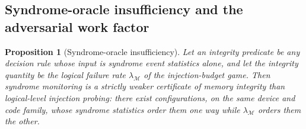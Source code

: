 \documentclass[pdflatex,sn-mathphys-num]{sn-jnl}
\theoremstyle{thmstyleone}
\newtheorem{proposition}[theorem]{Proposition}
\theoremstyle{thmstyletwo}
\theoremstyle{thmstylethree}
\begin{document}
\subsection{Syndrome-oracle insufficiency and the adversarial work factor}

\begin{proposition}[Syndrome-oracle insufficiency]\label{prop:syndrome-insufficient}
Let an \emph{integrity predicate} be any decision rule whose input is syndrome event statistics alone, and let the integrity quantity be the logical failure rate $\lambda_{\mathcal{M}}$ of the injection-budget game. Then syndrome monitoring is a strictly weaker certificate of memory integrity than logical-level injection probing: there exist configurations, on the same device and code family, whose syndrome statistics order them one way while $\lambda_{\mathcal{M}}$ orders them the other.
\end{proposition}
\end{document}
